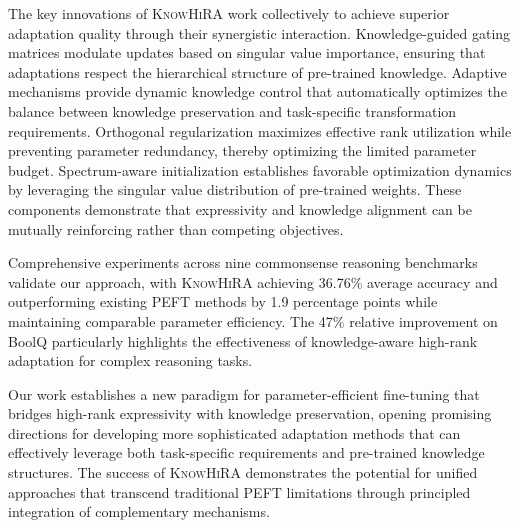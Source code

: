 \documentclass[10pt,letterpaper]{article}
\begin{document}
The key innovations of \textsc{KnowHiRA} work collectively to achieve superior adaptation quality through their synergistic interaction. Knowledge-guided gating matrices modulate updates based on singular value importance, ensuring that adaptations respect the hierarchical structure of pre-trained knowledge. Adaptive mechanisms provide dynamic knowledge control that automatically optimizes the balance between knowledge preservation and task-specific transformation requirements. Orthogonal regularization maximizes effective rank utilization while preventing parameter redundancy, thereby optimizing the limited parameter budget. Spectrum-aware initialization establishes favorable optimization dynamics by leveraging the singular value distribution of pre-trained weights. These components demonstrate that expressivity and knowledge alignment can be mutually reinforcing rather than competing objectives.

Comprehensive experiments across nine commonsense reasoning benchmarks validate our approach, with \textsc{KnowHiRA} achieving 36.76\% average accuracy and outperforming existing PEFT methods by 1.9 percentage points while maintaining comparable parameter efficiency. The 47\% relative improvement on BoolQ particularly highlights the effectiveness of knowledge-aware high-rank adaptation for complex reasoning tasks.

Our work establishes a new paradigm for parameter-efficient fine-tuning that bridges high-rank expressivity with knowledge preservation, opening promising directions for developing more sophisticated adaptation methods that can effectively leverage both task-specific requirements and pre-trained knowledge structures. The success of \textsc{KnowHiRA} demonstrates the potential for unified approaches that transcend traditional PEFT limitations through principled integration of complementary mechanisms.



\end{document}
